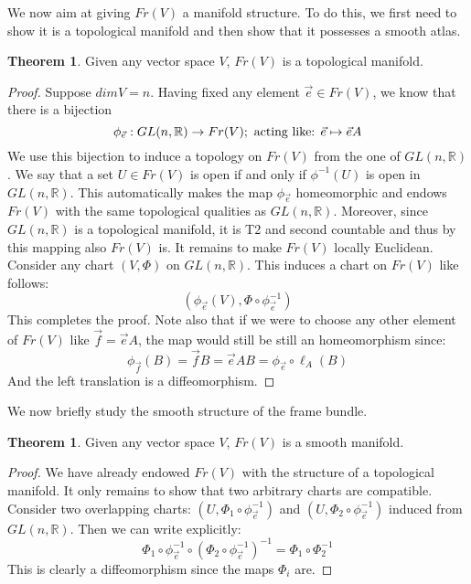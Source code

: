 \documentclass[12pt,a4paper]{report}
\theoremstyle{definition}
\theoremstyle{Theorem}
\newtheorem{Theo}[Def]{Theorem}
\theoremstyle{definition}
\theoremstyle{definition}
\begin{document}
	We now aim at giving $Fr(V)$ a manifold structure. To do this, we first need to show it is a topological manifold and then show that it possesses a smooth atlas.
	\begin{Theo}
		Given any vector space $V$, $Fr(V)$ is a topological manifold.
	\end{Theo}
	\begin{proof}
		Suppose $dim V=n$. Having fixed any element $\vec{e}\in Fr(V)$, we know that there is a bijection 
		$$\phi_{\vec{e}}:GL(n,\mathbb{R})\rightarrow Fr(V); \hbox{ acting like: }\vec{e}\mapsto\vec{e}A$$
		We use this bijection to induce a topology on $Fr(V)$ from the one of $GL(n,\mathbb{R})$. We say that a set $U\in Fr(V)$ is open if and only if $\phi^{-1}(U)$ is open in $GL(n,\mathbb{R})$. This automatically makes the map $\phi_{\vec{e}}$ homeomorphic and endows $Fr(V)$ with the same topological qualities as $GL(n,\mathbb{R})$. Moreover, since $GL(n,\mathbb{R})$ is a topological manifold, it is T2 and second countable and thus by this mapping also $Fr(V)$ is.
		It remains to make $Fr(V)$ locally Euclidean. Consider any chart $(V,\Phi)$ on $GL(n,\mathbb{R})$. This induces a chart on $Fr(V)$ like follows:
		$$(\phi_{\vec{e}}(V),\Phi\circ\phi^{-1}_{\vec{e}})$$
		This completes the proof.
		Note also that if we were to choose any other element of $Fr(V)$ like $\vec{f}=\vec{e}A$, the map would still be still an homeomorphism since:
		$$\phi_{\vec{f}}(B)=\vec{f}B=\vec{e}AB=\phi_{\vec{e}}\circ \ell_A(B)$$
		And the left translation is a diffeomorphism.
	\end{proof}
	We now briefly study the smooth structure of the frame bundle. 
	\begin{Theo}
		Given any vector space $V$, $Fr(V)$ is a smooth manifold.
	\end{Theo}
	\begin{proof}
		We have already endowed $Fr(V)$ with the structure of a topological manifold. It only remains to show that two arbitrary charts are compatible. Consider two overlapping charts: $(U,\Phi_1\circ\phi^{-1}_{\vec{e}})$ and $(U,\Phi_2\circ\phi^{-1}_{\vec{e}})$ induced from $GL(n,\mathbb{R})$. Then we can write explicitly:
		$$\Phi_1\circ\phi^{-1}_{\vec{e}}\circ (\Phi_2\circ\phi^{-1}_{\vec{e}})^{-1}=
		\Phi_1\circ \Phi_2^{-1}$$ 
		This is clearly a diffeomorphism since the maps $\Phi_i$ are.
	\end{proof}
\end{document}
